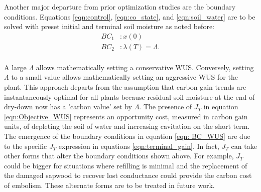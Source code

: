 \documentclass[utf8]{frontiersSCNS} %
\begin{document}
Another major departure from prior optimization studies are the boundary conditions. Equations \ref{eqn:control}, \ref{eqn:co_state}, and \ref{eqn:soil_water} are to be solved with preset initial and terminal soil moisture as noted before:
\begin{equation}
\label{eqn: BC_WUS}
    \begin{split}
        BC_1 &:x(0)\\
        BC_2 &:\lambda(T) = \Lambda.\\
    \end{split}
\end{equation}



A large $\Lambda$ allows mathematically setting a conservative WUS.  Conversely, setting $\Lambda$ to a small value allows mathematically setting an aggressive WUS for the plant. This approach departs from the assumption that carbon gain trends are instantaneously optimal for all plants because residual soil moisture at the end of dry-down now has a 'carbon value' set by $\Lambda$. The presence of $J_{T}$ in equation \ref{eqn:Objective_WUS} represents an opportunity cost, measured in carbon gain units, of depleting the soil of water and increasing cavitation on the short term. The emergence of the boundary conditions in equation \ref{eqn: BC_WUS} are due to the specific $J_T$ expression in equations \ref{eqn:terminal_gain}. In fact, $J_T$ can take other forms that alter the boundary conditions shown above. For example, $J_T$ could be bigger for situations where refilling is minimal and the replacement of the damaged sapwood to recover lost conductance could provide the carbon cost of embolism. These alternate forms are to be treated in future work.
\end{document}

